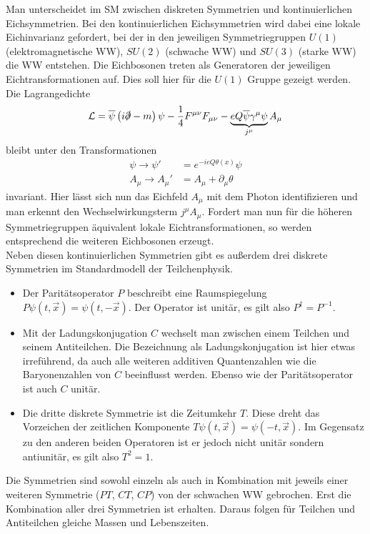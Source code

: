 Man unterscheidet im SM zwischen diskreten Symmetrien und kontinuierlichen Eichsymmetrien. Bei den kontinuierlichen Eichsymmetrien wird dabei eine lokale Eichinvarianz gefordert, bei der in den jeweiligen Symmetriegruppen $U(1)$ (elektromagnetische WW), $SU(2)$ (schwache WW) und $SU(3)$ (starke WW) die WW entstehen. Die Eichbosonen treten als Generatoren der jeweiligen Eichtransformationen auf. Dies soll hier für die $U(1)$ Gruppe gezeigt werden. Die Lagrangedichte 
\begin{equation}
\mathcal{L}=\overline{\psi}\left(i\slashed{\partial}-m\right)\psi-\frac{1}{4}F^{\mu\nu}F_{\mu\nu}-\underbrace{eQ\overline{\psi}\gamma^\mu\psi}_{j^\mu} A_\mu
\end{equation}
bleibt  unter den Transformationen
\begin{align}
\psi\rightarrow\psi'&=e^{-ieQ\theta(x)}\psi\\
A_\mu\rightarrow A_\mu'&=A_\mu+\partial_\mu\theta
\end{align}
invariant. Hier lässt sich nun das Eichfeld $A_\mu$ mit dem Photon identifizieren und man erkennt den Wechselwirkungsterm $j^\mu A_\mu$. Fordert man nun für die höheren Symmetriegruppen äquivalent lokale Eichtransformationen, so werden entsprechend die weiteren Eichbosonen erzeugt.\\
Neben diesen kontinuierlichen Symmetrien gibt es außerdem drei diskrete Symmetrien im Standardmodell der Teilchenphysik.
\begin{itemize}
\item Der Paritätsoperator $P$ beschreibt eine Raumspiegelung $P\psi(t,\vec{x})=\psi(t,-\vec{x})$. Der Operator ist unitär, es gilt also $P^\dagger=P^{-1}$.
\item Mit der Ladungskonjugation $C$ wechselt man zwischen einem Teilchen und seinem Antiteilchen. Die Bezeichnung als Ladungskonjugation ist hier etwas irreführend, da auch alle weiteren additiven Quantenzahlen wie die Baryonenzahlen von $C$ beeinflusst werden. Ebenso wie der Paritätsoperator ist auch $C$ unitär.
\item Die dritte diskrete Symmetrie ist die Zeitumkehr $T$. Diese dreht das Vorzeichen der zeitlichen Komponente $T\psi(t,\vec{x})=\psi(-t,\vec{x})$. Im Gegensatz zu den anderen beiden Operatoren ist er jedoch nicht unitär sondern antiunitär, es gilt also $T^2=1$.
\end{itemize}
Die Symmetrien sind sowohl einzeln als auch in Kombination mit jeweils einer weiteren Symmetrie ($P\!T$, $C\!T$, $C\!P$) von der schwachen WW gebrochen. Erst die Kombination \CPT aller drei Symmetrien ist erhalten. Daraus folgen für Teilchen und Antiteilchen gleiche Massen und Lebenszeiten.

